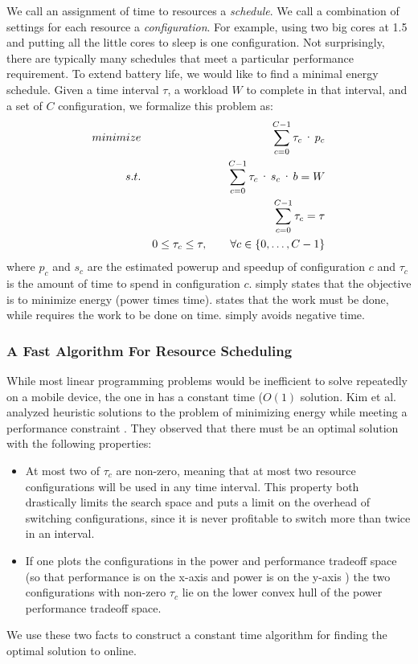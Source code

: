 We call an assignment of time to resources a \emph{schedule}. We call
a combination of settings for each resource a \emph{configuration}.  For
example, using two big cores at 1.5 \GHz and putting all the little
cores to sleep is one configuration.  Not surprisingly, there are
typically many schedules that meet a particular performance
requirement.  To extend battery life, we would like to find a minimal
energy schedule. Given a time interval $\tau$, a workload $W$ to
complete in that interval, and a set of $C$ configuration, we
formalize this problem as:
\begin{eqnarray}
  \minimize && \sum_{c=0}^{C-1} \tau_c \cdot p_c \label{eqn:power} \\
  \st %
  && \sum_{c=0}^{C-1} \tau_c \cdot s_c \cdot b =  W \label{eqn:work} \\
  && \sum_{c=0}^{C-1} \tau_c =  \tau \label{eqn:deadline} \\
  && 0 \le \tau_c \le \tau, \qquad \forall c \in \{0,\ldots,C-1\} \label{eqn:time}
\end{eqnarray}
where $p_c$ and $s_c$ are the estimated powerup and speedup of
configuration $c$ and $\tau_c$ is the amount of time to spend in
configuration $c$.   simply states that the objective is
to minimize energy (power times time).   states that the
work must be done, while  requires the work to be
done on time.   simply avoids negative time.  


\subsubsection{A Fast Algorithm For Resource Scheduling}
While most linear programming problems would be inefficient to solve
repeatedly on a mobile device, the one in  has a
constant time ($O(1)$ solution.  Kim et al. analyzed heuristic
solutions to the problem of minimizing energy while meeting a
performance constraint \cite{kim-cpsna}.  They observed that there
must be an optimal solution with the following properties:
\begin{itemize}
\item At most two of $\tau_c$ are non-zero, meaning that at most two
  resource configurations will be used in any time interval.  This
  property both drastically limits the search space and puts a limit
  on the overhead of switching configurations, since it is never
  profitable to switch more than twice in an interval.
\item If one plots the configurations in the power and performance
  tradeoff space (so that performance is on the x-axis and power is on
  the y-axis ) the two configurations with non-zero
  $\tau_c$ lie on the lower convex hull of the power performance
  tradeoff space.
\end{itemize}
We use these two facts to construct a constant time algorithm for
finding the optimal solution to  online.  


